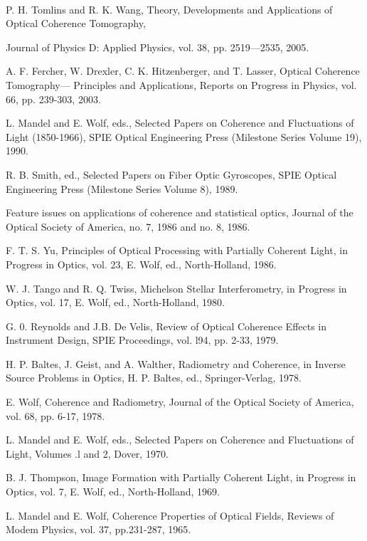 \documentclass{article}
\numberwithin{figure}{subsection}
\numberwithin{table}{subsection}
\begin{document}
\begin{spacing}{0.5}
\begin{hangparas}{0.25cm}{1}
\bigbreak{}\\
\par P. H. Tomlins and R. K. Wang, Theory, Developments and Applications of Optical Coherence Tomography,
\par Journal of Physics D: Applied Physics, vol. 38, pp. 2519—2535, 2005.\\
\par A. F. Fercher, W. Drexler, C. K. Hitzenberger, and T. Lasser, Optical Coherence Tomography—
Principles and Applications, Reports on Progress in Physics, vol. 66, pp. 239-303, 2003.\\
\par L. Mandel and E. Wolf, eds., Selected Papers on Coherence and Fluctuations of Light (1850-1966), SPIE Optical Engineering Press (Milestone Series Volume 19), 1990.\\
\par R. B. Smith, ed., Selected Papers on Fiber Optic Gyroscopes, SPIE Optical Engineering Press (Milestone Series Volume 8), 1989.\\
\par Feature issues on applications of coherence and statistical optics, Journal of the Optical Society of
America, no. 7, 1986 and no. 8, 1986.\\
\par F. T. S. Yu, Principles of Optical Processing with Partially Coherent Light, in Progress in Optics,
vol. 23, E. Wolf, ed., North-Holland, 1986.\\
\par W. J. Tango and R. Q. Twiss, Michelson Stellar Interferometry, in Progress in Optics, vol. 17, E. Wolf,
ed., North-Holland, 1980.\\
\par G. 0. Reynolds and J.B. De Velis, Review of Optical Coherence Effects in Instrument Design, SPIE
Proceedings, vol. l94, pp. 2-33, 1979.\\
\par H. P. Baltes, J. Geist, and A. Walther, Radiometry and Coherence, in Inverse Source Problems in
Optics, H. P. Baltes, ed., Springer-Verlag, 1978.\\
\par E. Wolf, Coherence and Radiometry, Journal of the Optical Society of America, vol. 68, pp. 6-17,
1978.\\
\par L. Mandel and E. Wolf, eds., Selected Papers on Coherence and Fluctuations of Light, Volumes .l
and 2, Dover, 1970.\\
\par B. J. Thompson, Image Formation with Partially Coherent Light, in Progress in Optics, vol. 7,
E. Wolf, ed., North-Holland, 1969.\\
\par L. Mandel and E. Wolf, Coherence Properties of Optical Fields, Reviews of Modem Physics, vol. 37,
pp.231-287, 1965.\\
\end{hangparas}
\end{spacing}
\end{document}
